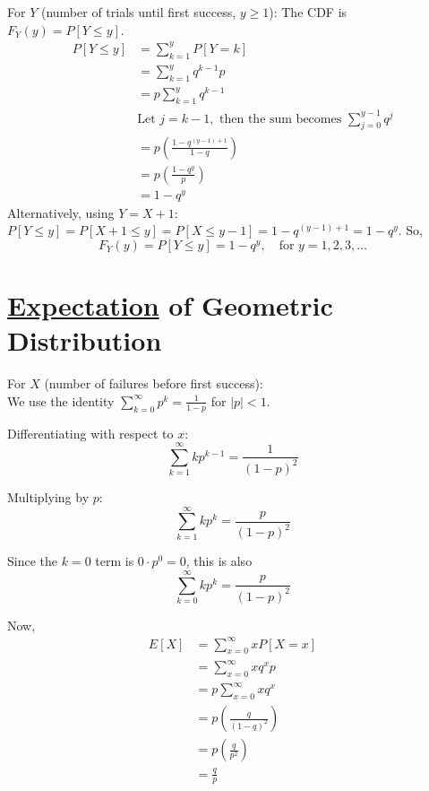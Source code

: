 For \(Y\) (number of trials until first success, \(y \ge 1\)):
The CDF is \(F_Y(y) = P[Y \le y]\).
\begin{align*}
  P[Y \le y] &= \sum_{k=1}^{y} P[Y=k] \\
             &= \sum_{k=1}^{y} q^{k-1} p \\
             &= p \sum_{k=1}^{y} q^{k-1} \\
             & \text{Let } j = k-1, \text{ then the sum becomes } \sum_{j=0}^{y-1} q^j \\
             &= p \left( \frac{1-q^{(y-1)+1}}{1-q} \right) \\
             &= p \left( \frac{1-q^{y}}{p} \right) \\
             &= 1 - q^{y}
\end{align*}
Alternatively, using \(Y=X+1\):
\(P[Y \le y] = P[X+1 \le y] = P[X \le y-1] = 1 - q^{(y-1)+1} = 1 - q^y\).
So,
\begin{equation}
  \label{eqn:cdf-geometric-Y}
  \boxed{F_Y(y) = P[Y \le y] = 1 - q^{y}, \quad \text{for } y = 1, 2, 3, \dots}
\end{equation}

\section{\href{sec:expectation-of-a-random-variable}{Expectation} of Geometric Distribution}
\label{sec:expectation-of-geometric-distribution}

For \(X\) (number of failures before first success):\\
We use the identity \(\sum_{k=0}^{\infty} p^k = \frac{1}{1-p}\) for \(|p|<1\).

Differentiating with respect to \(x\):
\[\sum_{k=1}^{\infty} kp^{k-1} = \frac{1}{(1-p)^2}\]

Multiplying by \(p\):
\[\sum_{k=1}^{\infty} kp^k = \frac{p}{(1-p)^2}\]

Since the \(k=0\) term is \(0 \cdot p^0 = 0\), this is also
\[\sum_{k=0}^{\infty} kp^k = \frac{p}{(1-p)^2}\]

Now,
\begin{align*}
  E[X] &= \sum_{x=0}^{\infty} x P[X=x] \\
       &= \sum_{x=0}^{\infty} x q^x p \\
       &= p \sum_{x=0}^{\infty} x q^x \\
       &= p \left( \frac{q}{(1-q)^2} \right) \\
       &= p \left( \frac{q}{p^2} \right) \\
       &= \frac{q}{p}
\end{align*}

